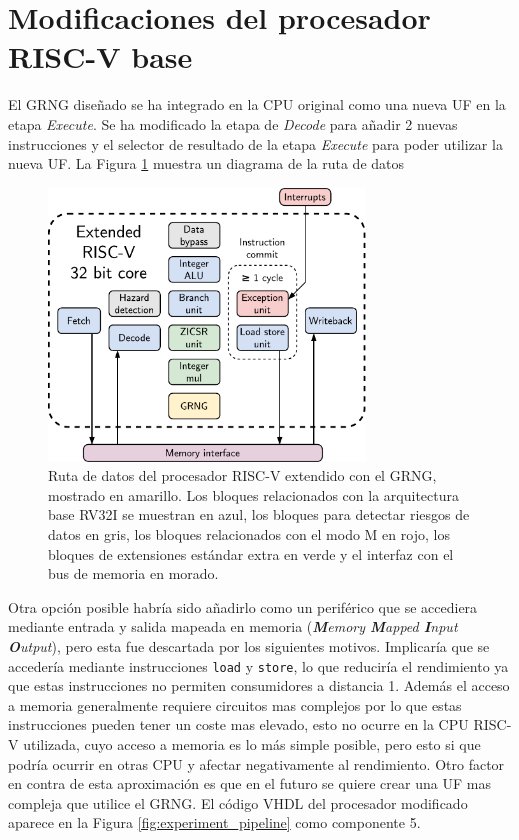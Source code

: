 \section{Modificaciones del procesador RISC-V base}

El GRNG diseñado se ha integrado en la CPU original como una nueva UF en la etapa \textit{Execute}. Se ha modificado la etapa de \textit{Decode} para añadir 2 nuevas instrucciones y el selector de resultado de la etapa \textit{Execute} para poder utilizar la nueva UF. La Figura \ref{fig:extended_riscv_core} muestra un diagrama de la ruta de datos 

\begin{figure}[h]
    \centering
    \includegraphics[width=0.75\textwidth]{root/Imagenes/riscv_ext/extended_core.pdf}
    \caption{Ruta de datos del procesador RISC-V extendido con el GRNG, mostrado en amarillo. Los bloques relacionados con la arquitectura base RV32I se muestran en azul, los bloques para detectar riesgos de datos en gris, los bloques relacionados con el modo M en rojo, los bloques de extensiones estándar extra en verde y el interfaz con el bus de memoria en morado.}
    \label{fig:extended_riscv_core}
\end{figure}



Otra opción posible habría sido añadirlo como un periférico que se accediera mediante entrada y salida mapeada en memoria (\textit{\textbf{M}emory \textbf{M}apped \textbf{I}nput \textbf{O}utput}), pero esta fue descartada por los siguientes motivos. Implicaría que se accedería mediante instrucciones \texttt{load} y \texttt{store}, lo que reduciría el rendimiento ya que estas instrucciones no permiten consumidores a distancia 1. Además el acceso a memoria generalmente requiere circuitos mas complejos por lo que estas instrucciones pueden tener un coste mas elevado, esto no ocurre en la CPU RISC-V utilizada, cuyo acceso a memoria es lo más simple posible, pero esto si que podría ocurrir en otras CPU y afectar negativamente al rendimiento. Otro factor en contra de esta aproximación es que en el futuro se quiere crear una UF mas compleja que utilice el GRNG. El código VHDL del procesador modificado aparece en la Figura \ref{fig:experiment_pipeline} como componente 5.

